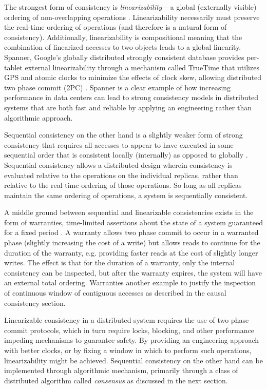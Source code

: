 \documentclass[letterpaper,twocolumn,10pt]{article}
\begin{document}
The strongest form of consistency is \textit{linearizability} -- a global (externally visible) ordering of non-overlapping operations \cite{herlihy_linearizability_1990}. Linearizability necessarily must preserve the real-time ordering of operations (and therefore is a natural form of consistency). Additionally, linearizability is compositional meaning that the combination of linearized accesses to two objects leads to a global linearity. Spanner, Google's globally distributed strongly consistent database provides per-tablet external linearizability through a mechanism called TrueTime that utilizes GPS and atomic clocks to minimize the effects of clock skew, allowing distributed two phase commit (2PC) \cite{corbett_spanner_2013}. Spanner is a clear example of how increasing performance in data centers can lead to strong consistency models in distributed systems that are both fast and reliable by applying an engineering rather than algorithmic approach.

Sequential consistency on the other hand is a slightly weaker form of strong consistency that requires all accesses to appear to have executed in some sequential order that is consistent locally (internally) as opposed to globally  \cite{attiya_sequential_1994}. Sequential consistency allows a distributed design wherein consistency is evaluated relative to the operations on the individual replicas, rather than relative to the real time ordering of those operations. So long as all replicas maintain the same ordering of operations, a system is sequentially consistent.

A middle ground between sequential and linearizable consistencies exists in the form of warranties, time-limited assertions about the state of a system guaranteed for a fixed period \cite{liu_warranties_2014}. A warranty allows two phase commit to occur in a warranted phase (slightly increasing the cost of a write) but allows reads to continue for the duration of the warranty, e.g. providing faster reads at the cost of slightly longer writes. The effect is that for the duration of a warranty, only the internal consistency can be inspected, but after the warranty expires, the system will have an external total ordering. Warranties another example to justify the inspection of continuous window of contiguous accesses as described in the causal consistency section.

Linearizable consistency in a distributed system requires the use of two phase commit protocols, which in turn require locks, blocking, and other performance impeding mechanisms to guarantee safety. By providing an engineering approach with better clocks, or by fixing a window in which to perform such operations, linearizability might be achieved. Sequential consistency on the other hand can be implemented through algorithmic mechanism, primarily through a class of distributed algorithm called \textit{consensus} as discussed in the next section.
\end{document}
